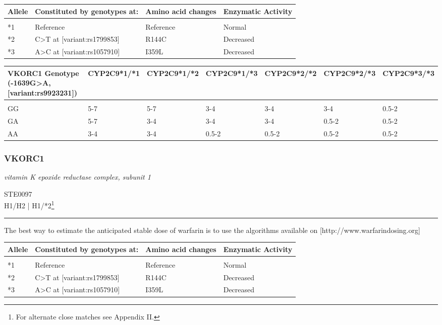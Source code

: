 \documentclass{report}
\begin{document}
      \begin{tabularx}{\textwidth}{ XXXX }
      \textbf{ Allele }&\textbf{ Constituted by genotypes at:}&\textbf{ Amino acid changes }&\textbf{ Enzymatic Activity } \\ \hline \\  *1 & Reference & Reference & Normal  \\  *2 & C>T at [variant:rs1799853] & R144C & Decreased  \\  *3 & A>C at [variant:rs1057910] & I359L & Decreased  \\ 
      \end{tabularx}
      
      \begin{tabularx}{\textwidth}{ XXXXXXX }
      \textbf{ VKORC1 Genotype (-1639G>A, [variant:rs9923231]) }&\textbf{ CYP2C9*1/*1 }&\textbf{ CYP2C9*1/*2 }&\textbf{ CYP2C9*1/*3 }&\textbf{ CYP2C9*2/*2 }&\textbf{ CYP2C9*2/*3 }&\textbf{ CYP2C9*3/*3} \\ \hline \\  GG & 5-7 & 5-7 & 3-4 & 3-4 & 3-4 & 0.5-2 \\  GA & 5-7 & 3-4 & 3-4 & 3-4 & 0.5-2 & 0.5-2 \\  AA & 3-4  & 3-4 & 0.5-2 & 0.5-2 & 0.5-2 & 0.5-2 \\ 
      \end{tabularx}
      
      \normalsize\subsubsection{ VKORC1 }
     \textit{ vitamin K epoxide reductase complex, subunit 1 } \begin{flushright} \textsc{ STE0097 \\ H1/H2  | H1/*2\footnote{For alternate close matches see Appendix II.} }\end{flushright}
      \hrule \vspace{6pt}
      The best way to estimate the anticipated stable dose of warfarin is to use the algorithms available on [http://www.warfarindosing.org] \newline
      \scriptsize
      
      \begin{tabularx}{\textwidth}{ XXXX }
      \textbf{ Allele }&\textbf{ Constituted by genotypes at:}&\textbf{ Amino acid changes }&\textbf{ Enzymatic Activity } \\ \hline \\  *1 & Reference & Reference & Normal  \\  *2 & C>T at [variant:rs1799853] & R144C & Decreased  \\  *3 & A>C at [variant:rs1057910] & I359L & Decreased  \\ 
      \end{tabularx}
      
\end{document}
